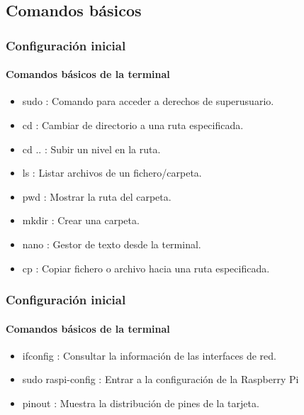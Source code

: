 \documentclass{beamer}
\begin{document}
	\subsection{Comandos básicos}
	\begin{frame}
		\frametitle{Configuración inicial}
		\framesubtitle{Comandos básicos de la terminal}
		\begin{tcolorbox}[enhanced, title= Instrucciones:]
			\begin{itemize}
				\item sudo :  Comando para acceder a derechos de superusuario.
				\item cd  : Cambiar de directorio a una ruta especificada.
				\item cd .. : Subir un nivel en la ruta.
				\item ls  : Listar archivos de un fichero/carpeta.
				\item pwd : Mostrar la ruta del carpeta.
				\item mkdir : Crear una carpeta.
				\item nano : Gestor de texto desde la terminal.
				\item cp   : Copiar fichero o archivo hacia una ruta especificada.
				
				
			\end{itemize}
		\end{tcolorbox}
		
	\end{frame}
	
	\begin{frame}
		\frametitle{Configuración inicial}
		\framesubtitle{Comandos básicos de la terminal}
		\begin{tcolorbox}[enhanced, title= Instrucciones:]
			\begin{itemize}
				\item ifconfig : Consultar la información de las interfaces de red.
				\item sudo raspi-config : Entrar a la configuración de la Raspberry Pi
				\item pinout : Muestra la distribución de pines de la tarjeta.
			\end{itemize}
		\end{tcolorbox}
		
		
	\end{frame}
\end{document}
